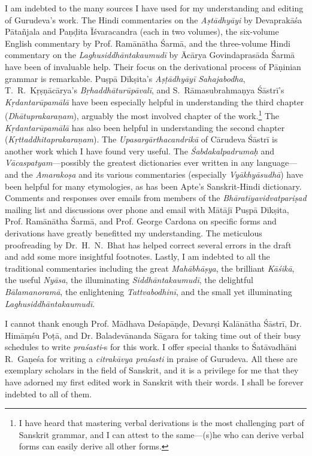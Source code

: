 \begin{sloppypar}\justifying\noindent\hspace{10mm} {\engtextfont I am indebted to the many sources I have used for my understanding and editing of Gurudeva’s work. The Hindi commentaries on the \textit{Aṣtādhyāyi} by Devaprakāśa Pātañjala and Paṇḍita Īśvaracandra (each in two volumes), the six-volume English commentary by Prof. Ramānātha Śarmā, and the three-volume Hindi commentary on the \textit{Laghu\-siddhānta\-kaumudī} by Ācārya Govindaprasāda Śarmā have been of invaluable help. Their focus on the derivational process of Pāṇinian grammar is remarkable. Puṣpā Dīkṣita’s \textit{Aṣṭādhyāyī Sahajabodha}, T.~R.~Kṛṣṇācārya’s \textit{Bṛhaddhātu\-rūpāvalī}, and S.~Rāmasubrahmaṇya Śāstrī’s \textit{Kṛdanta\-rūpamālā} have been especially helpful in understanding the third chapter (\textit{Dhātuprakaraṇam}), arguably the most involved chapter of the work.\footnote{{\engtextfont I have heard that mastering verbal derivations is the most challenging part of Sanskrit grammar, and I can attest to the same—(s)he who can derive verbal forms can easily derive all other forms.}} The \textit{Kṛdanta\-rūpamālā} has also been helpful in understanding the second chapter (\textit{Kṛttaddhita\-prakaraṇam}). The \textit{Upasargārtha\-candrikā} of Cārudeva Śāstrī is another work which I have found very useful. The \textit{Śabda\-kalpa\-drumaḥ} and \textit{Vācaspatyam}—possibly the greatest dictionaries ever written in any language—and the \textit{Amarakoṣa} and its various commentaries (especially \textit{Vyākhyā\-sudhā}) have been helpful for many etymologies, as has been Apte’s Sanskrit-Hindi dictionary. Comments and responses over emails from members of the \textit{Bhāratīya\-vidvat\-pariṣad} mailing list and discussions over phone and email with Mātājī Puṣpā Dīkṣita, Prof. Ramānātha Śarmā, and Prof. George Cardona on specific forms and derivations have greatly benefitted my understanding. The meticulous proofreading by Dr.~H.~N.~Bhat has helped correct several errors in the draft and add some more insightful footnotes. Lastly, I am indebted to all the traditional commentaries including the great \textit{Mahābhāṣya}, the brilliant \textit{Kāśikā}, the useful \textit{Nyāsa}, the illuminating \textit{Siddhānta\-kaumudī}, the delightful \textit{Bāla\-manoramā}, the enlightening \textit{Tattva\-bodhinī}, and the small yet illuminating \textit{Laghu\-siddhānta\-kaumudī}.}\end{sloppypar}
\begin{sloppypar}\justifying\noindent\hspace{10mm} {\engtextfont I cannot thank enough Prof. Mādhava Deśapāṇḍe, Devarṣi Kalānātha Śāstrī, Dr. Himāṃśu Poṭā, and Dr. Baladevānanda Sāgara for taking time out of their busy schedules to write \textit{praśasti}‑s for this work. I offer special thanks to Śatāvadhāni R.~Gaṇeśa for writing a \textit{citrakāvya praśasti} in praise of Gurudeva. All these are exemplary scholars in the field of Sanskrit, and it is a privilege for me that they have adorned my first edited work in Sanskrit with their words. I shall be forever indebted to all of them.}\end{sloppypar}
